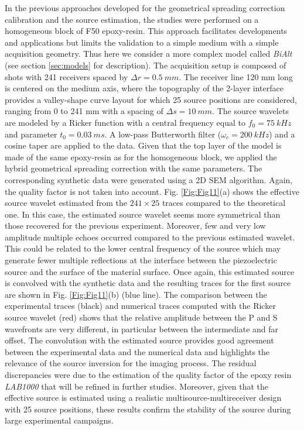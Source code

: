 \documentclass[extra,mreferee]{gji}
\newcommand{\bialt}{\textit{BiAlt} }
\newenvironment{orangenote}{\par\color{Orange}}{\par}
\begin{document}
\begin{orangenote}
In the previous approaches developed for the geometrical spreading correction calibration and the source estimation, the studies were performed on a homogeneous block of F50 epoxy-resin. This approach facilitates developments and applications but limits the validation to a simple medium with a simple acquisition geometry. Thus here we consider a more complex model called \bialt (see section \ref{sec:models} for description). The acquisition setup is composed of shots with 241 receivers spaced by $\Delta r=0.5\ mm$. The receiver line 120 mm long is centered on the medium axis, where the topography of the 2-layer interface provides a valley-shape curve layout for which 25 source positions are considered, ranging from 0 to 241 mm with a spacing of $\Delta s=10\ mm$. The source wavelets are modeled by a Ricker function with a central frequency equal to $f_{0}=75\ kHz$ and parameter $t_{0}=0.03\ ms$. A low-pass Butterworth filter ($\omega_{c}=200\ kHz$) and a cosine taper are applied to the data. Given that the top layer of the model is made of the same epoxy-resin as for the homogeneous block, we applied the hybrid geometrical spreading correction with the same parameters. The corresponding synthetic data were generated using a 2D SEM algorithm. Again, the quality factor is not taken into account. Fig. \ref{Fig:Fig11}(a) shows the effective source wavelet estimated from the $241 \times 25$ traces compared to the theoretical one. In this case, the estimated source wavelet seems more symmetrical than those recovered for the previous experiment. Moreover, few and very low amplitude multiple echoes occurred compared to the previous estimated wavelet. This could be related to the lower central frequency of the source which may generate fewer multiple reflections at the interface between the piezoelectric source and the surface of the material surface. Once again, this estimated source is convolved with the synthetic data and the resulting traces for the first source are shown in Fig. \ref{Fig:Fig11}(b) (blue line). The comparison between the experimental traces (black) and numerical traces computed with the Ricker source wavelet (red) shows that the relative amplitude between the P and S wavefronts are very different, in particular between the intermediate and far offset. The convolution with the estimated source provides good agreement between the experimental data and the numerical data and highlights the relevance of the source inversion for the imaging process. The residual discrepancies were due to the estimation of the quality factor of the epoxy resin \textit{LAB1000} that will be refined in further studies. Moreover, given that the effective source is estimated using a realistic multisource-multireceiver design with 25 source positions, these results confirm the stability of the source during large experimental campaigns. 

\end{orangenote}
\end{document}
